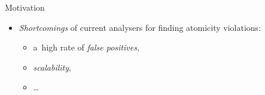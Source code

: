 \documentclass[10pt, hyperref={unicode}, aspectratio=169]{beamer}
\begin{document}
\begin{frame}[fragile]{Motivation}
    \begin{itemize}
        \item
            \emph{Shortcomings} of current analysers for finding
            \alert{atomicity violations}:

        \smallskip

        \begin{itemize}\setlength\itemsep{1em}
            \item
                a~high rate of \emph{false positives},

            \item
                \emph{scalability},

            \item
                \ldots
        \end{itemize}
    \end{itemize}
\end{frame}
\end{document}
